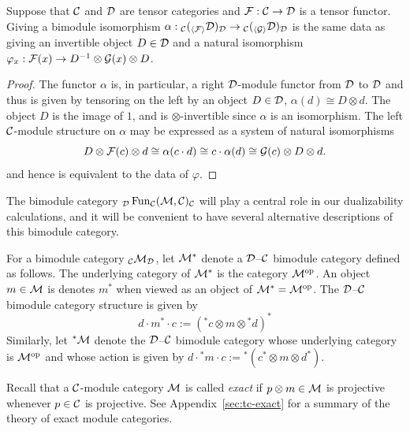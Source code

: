 \documentclass{amsart}
\begin{document}
\begin{lemma} \label{lem:BimoduleToFunctor}
Suppose that $\mathcal C$ and $\mathcal D$ are tensor categories and $\mathcal F: \mathcal C \rightarrow \mathcal D$ is a tensor functor.
Giving a bimodule isomorphism $\alpha:{}_{\mathcal C} ({}_{\langle \mathcal F \rangle} \mathcal D)_\mathcal D \rightarrow {}_{\mathcal C} ({}_{\langle \mathcal G \rangle} \mathcal D)_\mathcal D$ is the same data as giving an invertible object $D \in \mathcal D$ and a natural isomorphism $\varphi_x: \mathcal F(x) \rightarrow D^{-1} \otimes \mathcal G(x) \otimes D$.
\end{lemma}
\begin{proof}
The functor $\alpha$ is, in particular, a right $\mathcal D$-module functor from $\mathcal D$ to $\mathcal D$ and thus is given by tensoring on the left by an object $D \in \mathcal D$, $\alpha(d) \cong D \otimes d$. The object $D$ is the image of $1$, and is $\otimes$-invertible since $\alpha$ is an isomorphism. The left $\mathcal C$-module structure on $\alpha$ may be expressed as a system of natural isomorphisms
\begin{equation*}
	D \otimes \mathcal F(c) \otimes d \cong \alpha (c \cdot d) \cong c \cdot \alpha(d) \cong \mathcal G(c) \otimes D \otimes d.
\end{equation*}
and hence is equivalent to the data of $\varphi$. 
\end{proof}

The bimodule category ${}_\mathcal D \operatorname{Fun}_\mathcal C(\mathcal M,\mathcal C)_\mathcal C$ will play a central role in our dualizability calculations, and it will be convenient to have several alternative descriptions of this bimodule category.

\begin{definition} \label{def:Dual_bimodule_notation}
For a bimodule category ${}_\mathcal C \mathcal M_\mathcal D$, let $\mathcal M^*$ denote a $\mathcal D$--$\mathcal C$ bimodule category defined as follows.  The underlying category of $\mathcal M^*$ is the category $\mathcal M^{\mathrm{op}}$. An object $m \in \mathcal M$ is denotes $m^*$ when viewed as an object of $\mathcal M^* = \mathcal M^{\mathrm{op}}$.  The $\mathcal D$--$\mathcal C$ bimodule category structure is given by
\begin{equation*}
	d\cdot m^* \cdot c := ({}^*c \otimes m \otimes {}^*d)^*
\end{equation*}
Similarly, let ${}^*\mathcal M$ denote the $\mathcal D$--$\mathcal C$ bimodule category whose underlying category is $\mathcal M^{\mathrm{op}}$ and whose action is given by $d\cdot {}^*m \cdot c := {}^*(c^* \otimes m \otimes d^*)$.  
\end{definition}

Recall that a $\mathcal C$-module category $\mathcal M$ is called {\em exact} if $p \otimes m \in \mathcal M$ is projective whenever $p \in \mathcal C$ is projective.  See Appendix~\ref{sec:tc-exact} for a summary of the theory of exact module categories.
\end{document}
